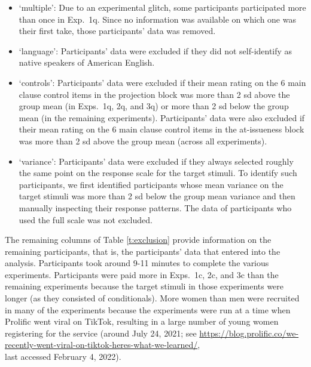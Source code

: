 \documentclass[11pt,fleqn]{article}
\newcommand{\6}{\mbox{$[\hspace*{-.6mm}[$}}
\newcommand{\9}{\mbox{$]\hspace*{-.6mm}]$}}
\begin{document}
\begin{itemize}[itemsep=-2pt]

\item `multiple': Due to an experimental glitch, some participants participated more than once in Exp.~1q. Since no information was available on which one was their first take, those participants' data was removed. 

\item `language': Participants' data were excluded if they did not self-identify as native speakers of American English.

\item `controls': Participants' data were excluded if their mean rating on the 6 main clause control items in the projection block was more than 2 sd above the group mean (in Exps.~1q, 2q, and 3q) or more than 2 sd below the group mean (in the remaining experiments). Participants' data were also excluded if their mean rating on the 6 main clause control items in the at-issueness block was more than 2 sd above the group mean (across all experiments).
 
\item `variance': Participants' data were excluded if they always selected roughly the same point on the response scale for the target stimuli. To identify such participants, we first identified participants whose mean variance on the target stimuli was more than 2 sd below the group mean variance and then manually inspecting their response patterns. The data of participants who used the full scale was not excluded.  
\end{itemize}

The remaining columns of Table \ref{t:exclusion} provide information on the remaining participants, that is, the participants' data that entered into the analysis. Participants took around 9-11 minutes to complete the various experiments. Participants were paid more in Exps.~1c, 2c, and 3c than the remaining experiments because the target stimuli in those experiments were longer (as they consisted of conditionals). More women than men were recruited in many of the experiments because the experiments were run at a time when Prolific went viral on TikTok, resulting in a large number of young women registering for the service (around July 24, 2021; see \url{https://blog.prolific.co/we-recently-went-viral-on-tiktok-heres-what-we-learned/}, \\ last accessed February 4, 2022).  

 
\end{document}

